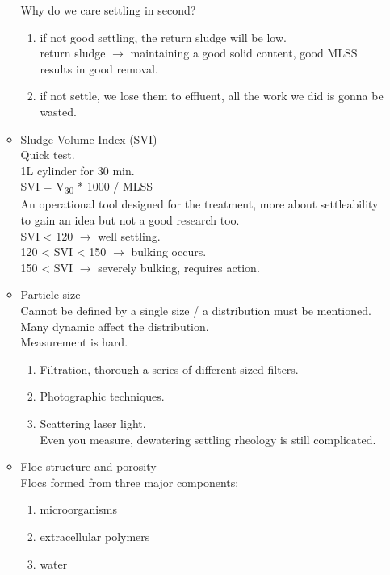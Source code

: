 \documentclass[12pt]{article}
\begin{document}
\begin{enumerate}
\begin{itemize}
        Why do we care settling in second?
        \begin{enumerate}
            \item if not good settling, the return sludge will be low.\\
            return sludge $\rightarrow$ maintaining a good solid content, good MLSS results in good removal.
            \item if not settle, we lose them to effluent, all the work we did is gonna be wasted.
        \end{enumerate}
        \item Sludge Volume Index (SVI)\\
        Quick test.\\
        1L cylinder for 30 min.\\
        SVI = V\textsubscript{30} * 1000 / MLSS\\ %
        An operational tool designed for the  treatment, more about settleability to gain an idea but not a good research too.\\
        SVI < 120 $\rightarrow$ well settling.\\
        120 < SVI < 150 $\rightarrow$ bulking occurs.\\
        150 < SVI $\rightarrow$ severely bulking, requires action.
        \item Particle size\\
        Cannot be defined by a single size / a distribution must be mentioned.
        Many dynamic affect the distribution.\\
        Measurement is hard.
        \begin{enumerate}
            \item Filtration, thorough a series of different sized filters.
            \item Photographic techniques.
            \item Scattering laser light.\\
            Even you measure, dewatering settling rheology is still complicated.
        \end{enumerate}
        \item Floc structure and porosity\\
        Flocs formed from three major components:
        \begin{enumerate}
            \item microorganisms
            \item extracellular polymers
            \item water\\

\end{enumerate}
\end{itemize}
\end{enumerate}
\end{document}

